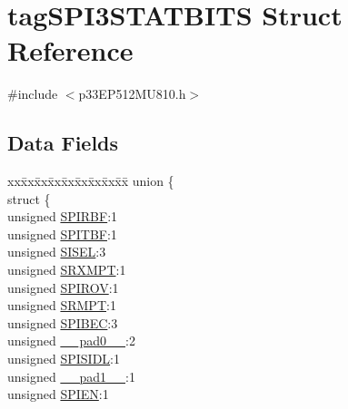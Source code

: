 \hypertarget{structtag_s_p_i3_s_t_a_t_b_i_t_s}{}\section{tag\+S\+P\+I3\+S\+T\+A\+T\+B\+I\+TS Struct Reference}
\label{structtag_s_p_i3_s_t_a_t_b_i_t_s}


{\ttfamily \#include $<$p33\+E\+P512\+M\+U810.\+h$>$}

\subsection*{Data Fields}
\begin{DoxyCompactItemize}
\item 
\begin{tabbing}
xx\=xx\=xx\=xx\=xx\=xx\=xx\=xx\=xx\=\kill
union \{\\
\>struct \{\\
\>\>unsigned \hyperlink{structtag_s_p_i3_s_t_a_t_b_i_t_s_aca81e0734a11061cfacfc4eeab87e4e9}{SPIRBF}:1\\
\>\>unsigned \hyperlink{structtag_s_p_i3_s_t_a_t_b_i_t_s_ad0edcfb75c96ed94138b2b1995ca0a91}{SPITBF}:1\\
\>\>unsigned \hyperlink{structtag_s_p_i3_s_t_a_t_b_i_t_s_a0aae6d6bf32c0591c0771f0947256bbc}{SISEL}:3\\
\>\>unsigned \hyperlink{structtag_s_p_i3_s_t_a_t_b_i_t_s_ac20c62c315f5e27133de699867a5072e}{SRXMPT}:1\\
\>\>unsigned \hyperlink{structtag_s_p_i3_s_t_a_t_b_i_t_s_a53721ff21767e781162f289a006cad5f}{SPIROV}:1\\
\>\>unsigned \hyperlink{structtag_s_p_i3_s_t_a_t_b_i_t_s_a4682f59fe87ae9344722baf5b4e0ab97}{SRMPT}:1\\
\>\>unsigned \hyperlink{structtag_s_p_i3_s_t_a_t_b_i_t_s_a2e2480d221f198907a6594dd78a2a234}{SPIBEC}:3\\
\>\>unsigned \hyperlink{structtag_s_p_i3_s_t_a_t_b_i_t_s_adf71f3d8410c1f1dbbc96680a92c49af}{\_\_pad0\_\_}:2\\
\>\>unsigned \hyperlink{structtag_s_p_i3_s_t_a_t_b_i_t_s_a73d48e3f46331c0141085ce1b20bcda4}{SPISIDL}:1\\
\>\>unsigned \hyperlink{structtag_s_p_i3_s_t_a_t_b_i_t_s_acaf2d0924a107ec6e8d2e31febaf66f9}{\_\_pad1\_\_}:1\\
\>\>unsigned \hyperlink{structtag_s_p_i3_s_t_a_t_b_i_t_s_abfc32d788a158c98350adfdd625de985}{SPIEN}:1\\

\end{tabbing}
\end{DoxyCompactItemize}
